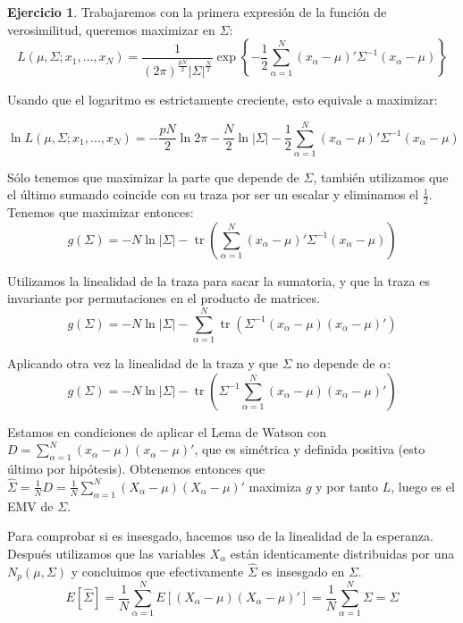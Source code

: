\documentclass[12pt,spanish]{article}
\theoremstyle{definition}
\newtheorem{exercise}{Ejercicio}
\begin{document}
\begin{exercise} %

  Trabajaremos con la primera expresión de la función de verosimilitud, queremos maximizar en $\Sigma$:
  \[L(\mu,\Sigma;x_1,\ldots,x_N)=\frac{1}{(2\pi)^\frac{pN}{2}|\Sigma|^\frac{N}{2}}\exp\left\{-\frac{1}{2}\sum_{\alpha=1}^N(x_\alpha-\mu)'\Sigma^{-1}(x_\alpha-\mu)\right\}\]

  Usando que el logaritmo es estrictamente creciente, esto equivale a
  maximizar:

  \[\ln L(\mu,\Sigma;x_1,\ldots,x_N)=-\frac{pN}{2}\ln 2\pi-\frac{N}{2}\ln |\Sigma|-\frac{1}{2}\sum_{\alpha=1}^N(x_\alpha-\mu)'\Sigma^{-1}(x_\alpha-\mu)\]

  Sólo tenemos que maximizar la parte que depende de $\Sigma$, también
  utilizamos que el último sumando coincide con su traza por ser un
  escalar y eliminamos el $\frac{1}{2}$. Tenemos que maximizar
  entonces:
  \[g(\Sigma)=-N\ln |\Sigma|-\operatorname{tr}\left(\sum_{\alpha=1}^N(x_\alpha-\mu)'\Sigma^{-1}(x_\alpha-\mu)\right)\]

  Utilizamos la linealidad de la traza para sacar la sumatoria, y que
  la traza es invariante por permutaciones en el producto de matrices.
  \[g(\Sigma)=-N\ln |\Sigma|-\sum_{\alpha=1}^N\operatorname{tr}\left(\Sigma^{-1}(x_\alpha-\mu)(x_\alpha-\mu)'\right)\]

  Aplicando otra vez la linealidad de la traza y que $\Sigma$ no depende de $\alpha$:
  \[g(\Sigma)=-N\ln |\Sigma|-\operatorname{tr}\left(\Sigma^{-1}\sum_{\alpha=1}^N(x_\alpha-\mu)(x_\alpha-\mu)'\right)\]

  Estamos en condiciones de aplicar el Lema de Watson con
  $D=\sum_{\alpha=1}^N(x_\alpha-\mu)(x_\alpha-\mu)'$, que es simétrica
  y definida positiva (esto último por hipótesis). Obtenemos entonces que
  $\hat{\Sigma}=\frac{1}{N}D=\frac{1}{N}\sum_{\alpha=1}^N(X_\alpha-\mu)(X_\alpha-\mu)'$
  maximiza $g$ y por tanto $L$, luego es el EMV de $\Sigma$.

  Para comprobar si es insesgado, hacemos uso de la linealidad de la
  esperanza. Después utilizamos que las variables $X_\alpha$ están
  identicamente distribuidas por una $N_p(\mu,\Sigma)$ y concluimos
  que efectivamente $\hat{\Sigma}$ es insesgado en $\Sigma$.
  \[E[\hat{\Sigma}]=\frac{1}{N}\sum_{\alpha=1}^NE[(X_\alpha-\mu)(X_\alpha-\mu)']=\frac{1}{N}\sum_{\alpha=1}^N\Sigma=\Sigma\]
\end{exercise}
\end{document}
